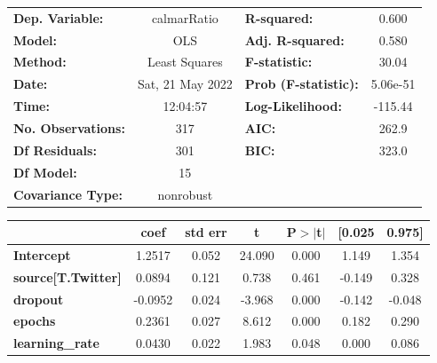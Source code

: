 \begin{center}
\begin{tabular}{lclc}
\toprule
\textbf{Dep. Variable:}              &   calmarRatio    & \textbf{  R-squared:         } &     0.600   \\
\textbf{Model:}                      &       OLS        & \textbf{  Adj. R-squared:    } &     0.580   \\
\textbf{Method:}                     &  Least Squares   & \textbf{  F-statistic:       } &     30.04   \\
\textbf{Date:}                       & Sat, 21 May 2022 & \textbf{  Prob (F-statistic):} &  5.06e-51   \\
\textbf{Time:}                       &     12:04:57     & \textbf{  Log-Likelihood:    } &   -115.44   \\
\textbf{No. Observations:}           &         317      & \textbf{  AIC:               } &     262.9   \\
\textbf{Df Residuals:}               &         301      & \textbf{  BIC:               } &     323.0   \\
\textbf{Df Model:}                   &          15      & \textbf{                     } &             \\
\textbf{Covariance Type:}            &    nonrobust     & \textbf{                     } &             \\
\bottomrule
\end{tabular}
\begin{tabular}{lcccccc}
                                     & \textbf{coef} & \textbf{std err} & \textbf{t} & \textbf{P$> |$t$|$} & \textbf{[0.025} & \textbf{0.975]}  \\
\midrule
\textbf{Intercept}                   &       1.2517  &        0.052     &    24.090  &         0.000        &        1.149    &        1.354     \\
\textbf{source[T.Twitter]}           &       0.0894  &        0.121     &     0.738  &         0.461        &       -0.149    &        0.328     \\
\textbf{dropout}                     &      -0.0952  &        0.024     &    -3.968  &         0.000        &       -0.142    &       -0.048     \\
\textbf{epochs}                      &       0.2361  &        0.027     &     8.612  &         0.000        &        0.182    &        0.290     \\
\textbf{learning\_rate}              &       0.0430  &        0.022     &     1.983  &         0.048        &        0.000    &        0.086     \\

\end{tabular}
\end{center}
